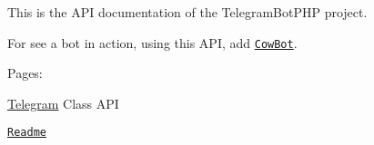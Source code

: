 This is the A\-P\-I documentation of the Telegram\-Bot\-P\-H\-P project.\par
 For see a bot in action, using this A\-P\-I, add \href{https://telegram.me/cowmooobot}{\tt Cow\-Bot}.\par
 Pages\-:\par
 \hyperlink{class_telegram}{Telegram} Class A\-P\-I \par
 \href{md__home_travis_build__eleirbag89__telegram_bot_p_h_p__r_e_a_d_m_e.html}{\tt Readme} 